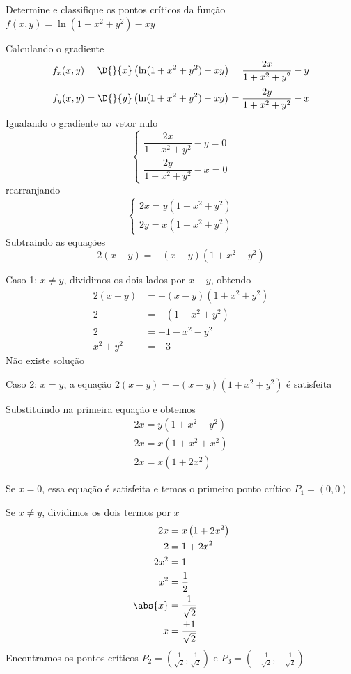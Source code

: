 \documentclass[a4paper,12pt,fleqn]{article}
\begin{document}

Determine e classifique os pontos críticos da função
\(
  f(x,y) = \ln(1+x^2+y^2) - xy
\)

\clearpagequestiononly

\begin{answer}
  Calculando o gradiente
  \[
    f_x(x, y)
    = \D{}{x}\left(\ln(1+x^2+y^2) - xy\right)
    = \frac{2x}{1+x^2+y^2} - y
  \]
  \[
    f_y(x, y)
    = \D{}{y}\left(\ln(1+x^2+y^2) - xy\right)
    = \frac{2y}{1+x^2+y^2} - x
  \]
  Igualando o gradiente ao vetor nulo
  \[
    \begin{cases}
      \dfrac{2x}{1+x^2+y^2} - y = 0 \\[4mm]
      \dfrac{2y}{1+x^2+y^2} - x = 0
    \end{cases}
  \]
  rearranjando
  \[
    \begin{cases}
      2x = y\left(1+x^2+y^2\right) \\
      2y = x\left(1+x^2+y^2\right)
    \end{cases}
  \]
  Subtraindo as equações
  \[
    2(x-y) = -(x-y)\left(1+x^2+y^2\right)
  \]

  Caso 1: $x\neq y$, dividimos os dois lados por $x-y$, obtendo
  \begin{align*}
    2(x-y)    & = -(x-y)\left(1+x^2+y^2\right) \\
    2         & = -\left(1 + x^2 + y^2\right)  \\
    2         & = -1 - x^2 - y^2               \\
    x^2 + y^2 & = -3
  \end{align*}
  Não existe solução

  \bigskip
  Caso 2: $x=y$, a equação \(2(x-y) = -(x-y)\left(1+x^2+y^2\right)\) é satisfeita

  Substituindo na primeira equação e obtemos
  \begin{align*}
    2x = y\left(1+x^2+y^2\right) \\
    2x = x\left(1+x^2+x^2\right) \\
    2x = x\left(1+2x^2\right)
  \end{align*}

  Se $x=0$, essa equação é satisfeita e temos o primeiro ponto crítico \(P_1=(0, 0)\)

  Se $x\neq y$, dividimos os dois termos por $x$
  \begin{align*}
    2x      & = x\left(1+2x^2\right) \\
    2       & = 1 + 2x^2             \\
    2x^2    & = 1                    \\
    x^2     & = \frac{1}{2}          \\
    \abs{x} & = \frac{1}{\sqrt{2}}   \\
    x       & = \frac{\pm 1}{\sqrt{2}}
  \end{align*}
  Encontramos os pontos críticos
  \(P_2 = \left( \frac{1}{\sqrt{2}},  \frac{1}{\sqrt{2}}\right)\) e
  \(P_3 = \left(-\frac{1}{\sqrt{2}}, -\frac{1}{\sqrt{2}}\right)\)


\end{answer}
\end{document}
